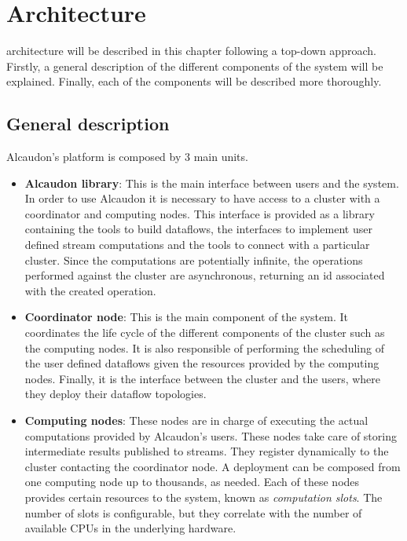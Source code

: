 \chapter{Architecture}
\label{chapter:architecture}

 architecture will be described in this chapter following a top-down
approach. Firstly, a general description of the different components of the system
will be explained. Finally, each of the components will be described more thoroughly.

\section{General description}

Alcaudon's platform is composed by 3 main units.

\begin{itemize}
\item \textbf{Alcaudon library}: This is the main interface between users
  and the system. In order to use Alcaudon it is necessary to have access to a
  cluster with a coordinator and computing nodes. This interface is provided as
  a library containing the tools to build dataflows, the interfaces to implement
  user defined stream computations and the tools to connect with a particular
  cluster. Since the computations are potentially infinite, the operations
  performed against the cluster are asynchronous, returning an id associated
  with the created operation.
\item \textbf{Coordinator node}: This is the main component of the system. It
  coordinates the life cycle of the different components of the cluster such as
  the computing nodes. It is also responsible of performing the scheduling of
  the user defined dataflows given the resources provided by the computing
  nodes. Finally, it is the interface between the cluster and the users, where
  they deploy their dataflow topologies.

\item \textbf{Computing nodes}: These nodes are in charge of executing the
  actual computations provided by Alcaudon's users. These nodes take care of
  storing intermediate results published to streams. They register dynamically
  to the cluster contacting the coordinator node. A deployment can be composed
  from one computing node up to thousands, as needed. Each of these nodes
  provides certain resources to the system, known as \textit{computation slots}.
  The number of slots is configurable, but they correlate with the number of
  available CPUs in the underlying hardware.
\end{itemize}

